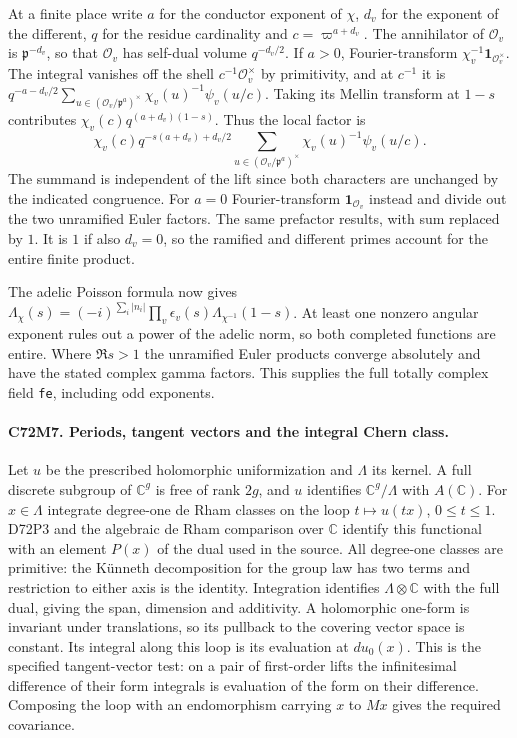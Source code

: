 At a finite place write $a$ for the conductor exponent of $\chi$,
$d_v$ for the exponent of the different, $q$ for the residue cardinality
and $c=\varpi^{a+d_v}$. The annihilator of $\mathcal O_v$ is
$\mathfrak p^{-d_v}$, so that $\mathcal O_v$ has self-dual volume
$q^{-d_v/2}$. If $a>0$, Fourier-transform
$\chi_v^{-1}\mathbf 1_{\mathcal O_v^\times}$. The integral vanishes
off the shell $c^{-1}\mathcal O_v^\times$ by primitivity, and at
$c^{-1}$ it is
$q^{-a-d_v/2}\sum_{u\in(\mathcal O_v/\mathfrak p^a)^\times}
\chi_v(u)^{-1}\psi_v(u/c)$. Taking its Mellin transform at $1-s$
contributes $\chi_v(c)q^{(a+d_v)(1-s)}$. Thus the local factor is
\[
 \chi_v(c)q^{-s(a+d_v)+d_v/2}
 \sum_{u\in(\mathcal O_v/\mathfrak p^a)^\times}
       \chi_v(u)^{-1}\psi_v(u/c).
\]
The summand is independent of the lift since both characters are
unchanged by the indicated congruence. For $a=0$ Fourier-transform
$\mathbf 1_{\mathcal O_v}$ instead and divide out the two unramified
Euler factors. The same prefactor results, with sum replaced by $1$.
It is $1$ if also $d_v=0$, so the ramified and different primes
account for the entire finite product.

The adelic Poisson formula now gives
$\Lambda_\chi(s)=(-i)^{\sum_i |n_i|}\prod_v\epsilon_v(s)
\Lambda_{\chi^{-1}}(1-s)$. At least one nonzero angular exponent
rules out a power of the adelic norm, so both completed functions
are entire. Where $\Re s>1$ the unramified Euler products converge
absolutely and have the stated complex gamma factors. This supplies
the full totally complex field \texttt{fe}, including odd exponents.

\paragraph{C72M7. Periods, tangent vectors and the integral Chern class.}
Let $u$ be the prescribed holomorphic uniformization and $\Lambda$
its kernel. A full discrete subgroup of $\mathbb C^g$ is free of rank
$2g$, and $u$ identifies $\mathbb C^g/\Lambda$ with $A(\mathbb C)$.
For $x\in\Lambda$ integrate degree-one de Rham classes on the loop
$t\mapsto u(tx)$, $0\le t\le1$. D72P3 and the algebraic de Rham
comparison over $\mathbb C$ identify this functional with an element
$P(x)$ of the dual used in the source. All degree-one classes are
primitive: the Künneth decomposition for the group law has two terms
and restriction to either axis is the identity. Integration identifies
$\Lambda\otimes\mathbb C$ with the full dual, giving the span,
dimension and additivity. A holomorphic one-form is invariant
under translations, so its pullback to the covering vector space
is constant. Its integral along this loop is its evaluation at
$du_0(x)$. This is the specified tangent-vector test: on a pair
of first-order lifts the infinitesimal difference of their form
integrals is evaluation of the form on their difference. Composing
the loop with an endomorphism carrying $x$ to $Mx$ gives the
required covariance.

